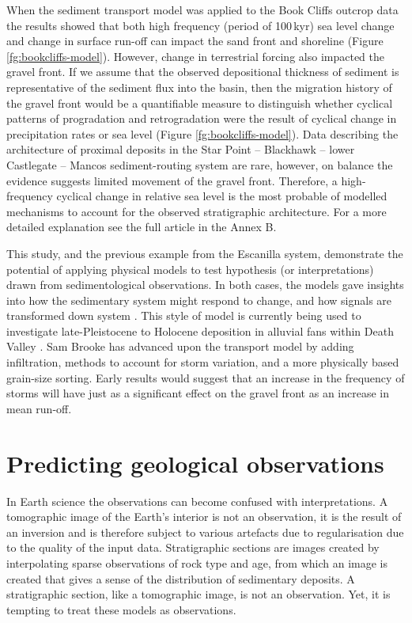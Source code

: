 When the sediment transport model was applied to the Book Cliffs outcrop data the results showed that both high frequency (period of 100\,kyr) sea level change and change in surface run-off can impact the sand front and shoreline (Figure \ref{fg:bookcliffs-model}). However, change in terrestrial forcing also impacted the gravel front. If we assume that the observed depositional thickness of sediment is representative of the sediment flux into the basin, then the migration history of the gravel front would be a quantifiable measure to distinguish whether cyclical patterns of progradation and retrogradation were the result of cyclical change in precipitation rates or sea level (Figure \ref{fg:bookcliffs-model}). Data describing the architecture of proximal deposits in the Star Point -- Blackhawk -- lower Castlegate -- Mancos sediment-routing system are rare, however, on balance the evidence suggests limited movement of the gravel front. Therefore, a high-frequency cyclical change in relative sea level is the most probable of modelled mechanisms to account for the observed stratigraphic architecture. For a more detailed explanation see the full article in the Annex B.

This study, and the previous example from the Escanilla system, demonstrate the potential of applying physical models to test hypothesis (or interpretations) drawn from sedimentological observations. In both cases, the models gave insights into how the sedimentary system might respond to change, and how signals are transformed down system \citep{armitage-etal-ngeo-2011}. This style of model is currently being used to investigate late-Pleistocene to Holocene deposition in alluvial fans within Death Valley \citep[see][]{brooke-etal-2018}. Sam Brooke has advanced upon the transport model by adding infiltration, methods to account for storm variation, and a more physically based grain-size sorting. Early results would suggest that an increase in the frequency of storms will have just as a significant effect on the gravel front as an increase in mean run-off. 

\section{Predicting geological observations}

In Earth science the observations can become confused with interpretations. A tomographic image of the Earth's interior is not an observation, it is the result of an inversion and is therefore subject to various artefacts due to regularisation due to the quality of the input data. Stratigraphic sections are images created by interpolating sparse observations of rock type and age, from which an image is created that gives a sense of the distribution of sedimentary deposits. A stratigraphic section, like a tomographic image, is not an observation. Yet, it is tempting to treat these models as observations.

